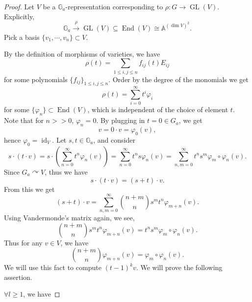 \documentclass[10pt]{article}
\numberwithin{equation}{theorem}
\DeclareMathOperator{\End}{End}
\DeclareMathOperator{\GL}{GL}
\DeclareMathOperator{\id}{id}
\newcommand{\G}[0]{\mathbb{G}}
\newcommand{\A}[0]{\mathbb{A}}
\begin{document}
\begin{proof}
  Let $V$ be a $\G_a$-representation corresponding to $\rho:G\to\GL(V)$. 
  Explicitly,
  \begin{equation*}
    \G_a\stackrel{\rho}{\to}\GL(V)\subseteq\End(V)\cong\A^{(\dim V)^2}.
  \end{equation*}
  Pick a basis $\{v_1,\cdots,v_n\}\subset V$.
  \par By the definition of morphisms of varieties, we have 
  \begin{equation*}
    \rho(t) = \sum_{1\leq i,j\leq n} f_{ij}(t)E_{ij}
  \end{equation*}
  for some polynomials $\{f_{ij}\}_{1\leq i,j\leq n}$. Order by the degree of the monomials we get 
  \begin{equation*}
    \rho(t) = \sum_{i=0}^\infty t^i \varphi_i
  \end{equation*}
  for some $\{\varphi_n\}\subset\End(V)$, which is independent of the choice of element $t$. 
  Note that for $n>>0$, $\varphi_n = 0$. By plugging in $t = 0\in G_a$, we get 
  \begin{equation*}
    v = 0\cdot v = \varphi_0(v),
  \end{equation*}
  hence $\varphi_0=\id_V$. Let $s,t\in\G_a$, and consider 
  \begin{equation*}
    s\cdot(t\cdot v) = s\cdot\left(\sum_{n=0}^\infty t^n\varphi_n(v)\right) = \sum_{n=0}^\infty t^ns\varphi_n(v) = \sum_{n,m=0}^\infty t^ns^m\varphi_m\circ\varphi_n(v). 
  \end{equation*}
  Since $G_a\curvearrowright V$, thus we have 
  \begin{equation*}
    s\cdot(t\cdot v) = (s+t)\cdot v.
  \end{equation*}
  From this we get 
  \begin{equation*}
    (s+t)\cdot v = \sum_{n,m=0}^\infty { n+m \choose n}s^mt^n\varphi_{m+n}(v).
  \end{equation*}
  Using Vandermonde's matrix again, we see, 
  \begin{equation*}
    {n+m \choose n}s^mt^n  \varphi_{m+n}(v) = t^ns^m\varphi_m\circ\varphi_n(v).
  \end{equation*}
  Thus for any $v\in V$, we have 
  \begin{equation*}
    {n+m \choose n}\varphi_{m+n}(v) = \varphi_m\circ\varphi_n(v).
  \end{equation*}
  We will use this fact to compute $(t-1)^kv$. We will prove the following assertion.\\
  \par $\forall l\geq 1$, we have 

\end{proof}
\end{document}
